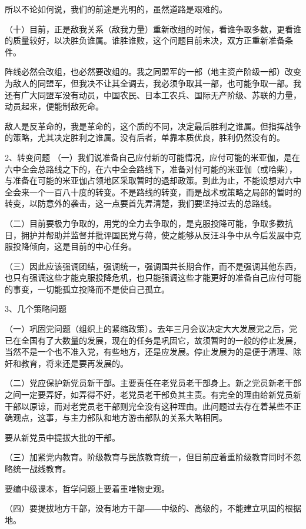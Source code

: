 所以不论如何说，我们的前途是光明的，虽然道路是艰难的。

（十）目前，正是敌我关系（敌我力量）重新改组的时候，看谁争取多数，更看谁的质量较好，以决胜负谁属。谁胜谁败，这个问题目前未决，双方正重新准备条件。

阵线必然会改组，也必然要改组的。我之同盟军的一部（地主资产阶级一部）改变为敌人的同盟军，但我决不让其全调去，我必须争取其一部，也可能争取一部。我还有广大同盟军没有动员，中国农民、日本工农兵、国际无产阶级、苏联的力量，动员起来，便能制敌死命。

敌人是反革命的，我是革命的，这个质的不同，决定最后胜利之谁属。但指挥战争的策略，尤其决定胜利之谁属。没有后者，单靠本质优良，胜利仍然没有的。

2、转变问题
（一）我们说准备自己应付新的可能情况，应付可能的米亚伽，是在六中全会总路线之下的，在六中全会路线下，准备对付可能的米亚伽（或哈柴），与准备在可能的米亚伽占领地区采取暂时的退却政策。到此为止，不能设想对六中全会来一个一百八十度的转变。不是路线的转变，而是战术或策略之局部的暂时的转变，以防意外的袭击，这一点要首先弄清楚，我们要坚持过去的总路线。

（二）目前要极力争取的，用党的全力去争取的，是克服投降可能，争取多数抗日，拥护并帮助并监督并批评国民党与蒋，使之能够从反汪斗争中从今后发展中克服投降倾向，这是目前的中心任务。

（三）因此应该强调团结，强调统一，强调国共长期合作，而不是强调其他东西，也只有强调这些才能克服投降危机，也只能强调这些才能更好的准备自己应付可能的事变，一切能孤立投降而不是使自己孤立。

3、几个策略问题

（一）巩固党问题（组织上的紧缩政策）。去年三月会议决定大大发展党之后，党已在全国有了大数量的发展，现在的任务是巩固它，故须暂时的一般的停止发展，当然不是一个也不准入党，有些地方，还是应发展。停止发展为的是便于清理、除奸和教育，将来还是要再发展的。

（二）党应保护新党员新干部。主要责任在老党员老干部身上。新之党员新老干部之间一定要弄好，如弄得不好，老党员老干部负其主责。有完全的理由给新党员新干部以原谅，而对老党员老干部则完全没有这种理由。此问题过去存在着某些不正确观点，这事，与主力部队和地方游击部队的关系大略相同。

要从新党员中提拔大批的干部。


（三）加紧党内教育。阶级教育与民族教育统一，但目前应着重阶级教育同时不忽略统一战线教育。

要编中级课本，哲学问题上要着重唯物史观。

（四）要提拔地方干部，没有地方干部――中级的、高级的，不能建立巩固的根据地。

